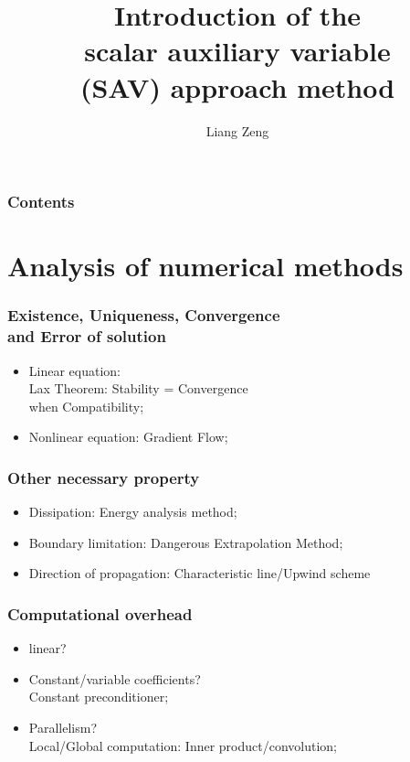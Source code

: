 \documentclass{beamer}
\title{Introduction of the\\ scalar auxiliary variable \\(SAV) approach method}
\author{Liang Zeng}
\begin{document}
\frame{\titlepage}
\begin{frame}
\frametitle{Contents}
  \tableofcontents
\end{frame}
\section{Analysis of numerical methods}

    \begin{frame}
    \frametitle{Existence, Uniqueness, Convergence \\and Error of solution}

	\begin{itemize}
	\item Linear equation: \\
	Lax Theorem: Stability = Convergence\\
	 when Compatibility;
	\item Nonlinear equation: Gradient Flow\cite{doi:10.1137/17M1159968};
	\end{itemize}
	

    \end{frame}
    \begin{frame}
    \frametitle{Other necessary property}
    \begin{itemize}
    \item Dissipation: Energy analysis method;
    \item Boundary limitation: Dangerous Extrapolation Method;
    \item Direction of propagation: Characteristic line/Upwind scheme
    \end{itemize}

    \end{frame}

    \begin{frame}
    \frametitle{Computational overhead}
\begin{itemize}
\item linear?
\item Constant/variable coefficients?\\
Constant preconditioner;
\item Parallelism?\\
Local/Global computation: Inner product/convolution;
\end{itemize}

    \end{frame}
\end{document}
